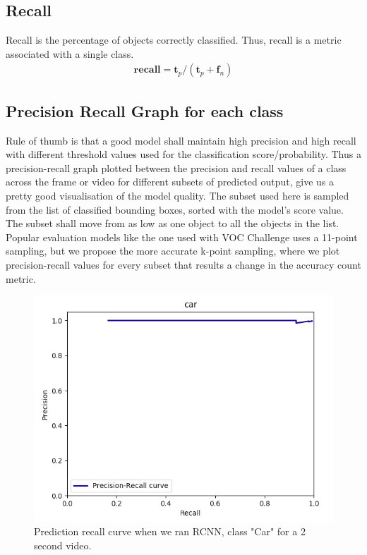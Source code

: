 \documentclass[conference]{IEEEtran}
\newcommand{\figwidthb}{0.80\linewidth}
\begin{document}
\subsection{Recall}
	Recall is the percentage of objects correctly classified. Thus, recall is a metric associated with a single class.
	\begin{align}
	\mathbf{recall}=\mathbf{t}_p / (\mathbf{t}_p + \mathbf{f}_n)
	\end{align}
\subsection{Precision Recall Graph for each class}
	Rule of thumb is that a good model shall maintain high precision and high recall with different threshold values used for the classification score/probability. Thus a precision-recall graph plotted between the precision and recall values of a class across the frame or video for different subsets of predicted output, give us a pretty good visualisation of the model quality. The subset used here is sampled from the list of classified bounding boxes, sorted with the model's score value. The subset shall move from as low as one object to all the objects in the list. Popular evaluation models like the one used with VOC Challenge uses a 11-point sampling, but we propose the more accurate k-point sampling, where we plot precision-recall values for every subset that results a change in the accuracy count metric.
\begin{figure}
\centering
\includegraphics[width=\figwidthb]{fig/pr_rcnn.png}
\caption{Prediction recall curve when we ran RCNN, class "Car" for a 2 second video.} \label{fig.structure}
\end{figure}
\end{document}
